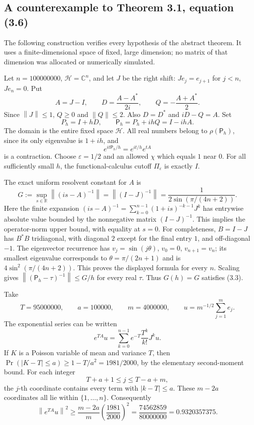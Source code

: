 \documentclass[10pt]{article}
\begin{document}
\subsection*{A counterexample to Theorem 3.1, equation (3.6)}
The following construction verifies every hypothesis of the abstract theorem. It uses a finite-dimensional space of fixed, large dimension; no matrix of that dimension was allocated or numerically simulated.\par
Let \(n=100000000\), \(\mathcal H=\mathbb C^n\), and let \(J\) be the right shift: \(Je_j=e_{j+1}\) for \(j<n\), \(Je_n=0\). Put \[A=J-I,\qquad D=\frac{A-A^*}{2i},\qquad
 Q=-\frac{A+A^*}{2}.\] Since \(\left\|J\right\|\leq1\), \(Q\geq0\) and \(\left\|Q\right\|\leq2\). Also \(D=D^*\) and \(iD-Q=A\). Set \[P_h=I+hD,\qquad \mathsf P_h=P_h+ihQ=I-ihA.\] The domain is the entire fixed space \(\mathcal H\). All real numbers belong to \(\rho(\mathsf P_h)\), since its only eigenvalue is \(1+ih\), and \[e^{it\mathsf P_h/h}=e^{it/h}e^{tA}\] is a contraction. Choose \(\varepsilon=1/2\) and an allowed \(\chi\) which equals \(1\) near \(0\). For all sufficiently small \(h\), the functional-calculus cutoff \(\Pi_\varepsilon\) is exactly \(I\).\par
The exact uniform resolvent constant for \(A\) is \[G:=\sup_{s\in\mathbb R}\left\|(is-A)^{-1}\right\|
 =\left\|(I-J)^{-1}\right\|
 =\frac1{2\sin(\pi/(4n+2))}.\] Here the finite expansion \((is-A)^{-1}=\sum_{k=0}^{n-1}(1+is)^{-k-1}J^k\) has entrywise absolute value bounded by the nonnegative matrix \((I-J)^{-1}\). This implies the operator-norm upper bound, with equality at \(s=0\). For completeness, \(B=I-J\) has \(B^*B\) tridiagonal, with diagonal \(2\) except for the final entry \(1\), and off-diagonal \(-1\). The eigenvector recurrence has \(v_j=\sin(j\theta)\), \(v_0=0\), \(v_{n+1}=v_n\); its smallest eigenvalue corresponds to \(\theta=\pi/(2n+1)\) and is \(4\sin^2(\pi/(4n+2))\). This proves the displayed formula for every \(n\). Scaling gives \(\left\|(\mathsf P_h-\tau)^{-1}\right\|\leq G/h\) for every real \(\tau\). Thus \(G(h)=G\) satisfies (3.3).\par
Take \[T=95000000,\qquad a=100000,\qquad m=4000000,\qquad
 u=m^{-1/2}\sum_{j=1}^{m}e_j.\] The exponential series can be written \[e^{TA}u=\sum_{k=0}^{n-1}e^{-T}\frac{T^k}{k!}J^ku.\] If \(K\) is a Poisson variable of mean and variance \(T\), then \(\Pr(|K-T|\leq a)\geq1-T/a^2=1981/2000\), by the elementary second-moment bound. For each integer \[T+a+1\leq j\leq T-a+m,\] the \(j\)-th coordinate contains every term with \(|k-T|\leq a\). These \(m-2a\) coordinates all lie within \(\{1,\dots,n\}\). Consequently \[\left\|e^{TA}u\right\|^2
 \geq \frac{m-2a}{m}\left(\frac{1981}{2000}\right)^2
 =\frac{74562859}{80000000}
 =0.9320357375.\]\par
\end{document}
